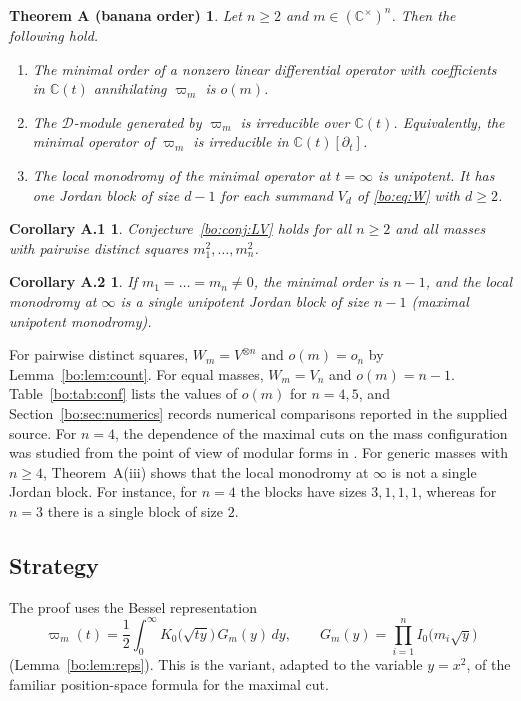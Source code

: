 \documentclass[11pt,a4paper]{article}
\newtheorem*{theoremA}{Theorem A (banana order)}
\newtheorem*{corollaryB}{Corollary A.1}
\newtheorem*{corollaryC}{Corollary A.2}
\theoremstyle{definition}
\theoremstyle{remark}
\numberwithin{equation}{section}
\newcommand{\C}{\mathbb{C}}
\newcommand{\cD}{\mathcal{D}}
\begin{document}
\begin{theoremA}\label{bo:thm:main}
Let $n\ge2$ and $m\in(\C^\times)^n$. Then the following hold.
\begin{enumerate}
\item[(i)] The minimal order of a nonzero linear differential operator with coefficients in $\C(t)$ annihilating $\varpi_m$ is $o(m)$.
\item[(ii)] The $\cD$-module generated by $\varpi_m$ is irreducible over $\C(t)$. Equivalently, the minimal operator of $\varpi_m$ is irreducible in $\C(t)[\partial_t]$.
\item[(iii)] The local monodromy of the minimal operator at $t=\infty$ is unipotent. It has one Jordan block of size $d-1$ for each summand $V_d$ of \eqref{bo:eq:W} with $d\ge2$.
\end{enumerate}
\end{theoremA}

\begin{corollaryB}
Conjecture~\ref{bo:conj:LV} holds for all $n\ge2$ and all masses with pairwise distinct squares $m_1^2,\dots,m_n^2$.
\end{corollaryB}

\begin{corollaryC}\label{bo:cor:equal}
If $m_1=\dots=m_n\ne0$, the minimal order is $n-1$, and the local monodromy at $\infty$ is a single unipotent Jordan block of size $n-1$ (maximal unipotent monodromy).
\end{corollaryC}

For pairwise distinct squares, $W_m=V^{\otimes n}$ and $o(m)=o_n$ by Lemma~\ref{bo:lem:count}. For equal masses, $W_m=V_n$ and $o(m)=n-1$. Table~\ref{bo:tab:conf} lists the values of $o(m)$ for $n=4,5$, and Section~\ref{bo:sec:numerics} records numerical comparisons reported in the supplied source. For $n=4$, the dependence of the maximal cuts on the mass configuration was studied from the point of view of modular forms in \cite{Duh25}. For generic masses with $n\ge4$, Theorem~A(iii) shows that the local monodromy at $\infty$ is not a single Jordan block. For instance, for $n=4$ the blocks have sizes $3,1,1,1$, whereas for $n=3$ there is a single block of size $2$.

\subsection{Strategy}
The proof uses the Bessel representation
\begin{equation}\label{bo:eq:bessel}
\varpi_m(t)=\frac12\int_0^\infty K_0\bigl(\sqrt{ty}\bigr)\,G_m(y)\,dy,\qquad G_m(y)=\prod_{i=1}^nI_0\bigl(m_i\sqrt y\bigr)
\end{equation}
(Lemma~\ref{bo:lem:reps}). This is the variant, adapted to the variable $y=x^2$, of the familiar position-space formula for the maximal cut.
\end{document}

